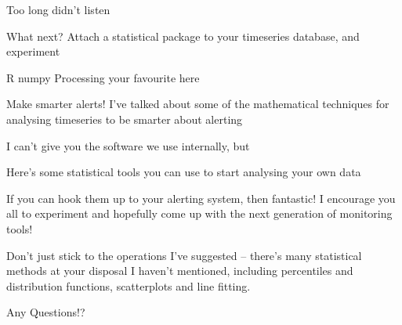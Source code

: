 \documentclass[online,helvetica]{chaksem}
\begin{document}
Too long didn't listen

What next?
Attach a statistical package to your timeseries database, and experiment

R
numpy
Processing
your favourite here

Make smarter alerts!
I've talked about some of the mathematical techniques for analysing timeseries to be smarter about alerting

I can't give you the software we use internally, but

Here's some statistical tools you can use to start analysing your own data

If you can hook them up to your alerting system, then fantastic!  I encourage you all to experiment and hopefully come up with the next generation of monitoring tools!

Don't just stick to the operations I've suggested -- there's many statistical methods at your disposal I haven't mentioned, including percentiles and distribution functions, scatterplots and line fitting.

Any Questions!?
\end{document}
